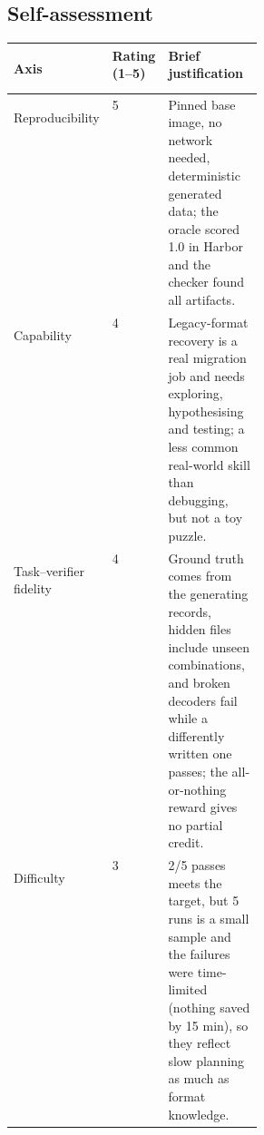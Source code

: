 \documentclass[11pt]{article}
\begin{document}
\subsection*{Self-assessment}
\vspace{-4pt}
\begin{center}
\renewcommand{\arraystretch}{1.15}
\begin{tabularx}{\linewidth}{>{\bfseries\raggedright\arraybackslash}p{0.19\linewidth}p{0.125\linewidth}X}
  \toprule
  Axis & Rating (1--5) & Brief justification \\
  \midrule
  Reproducibility & 5 & Pinned base image, no network needed, deterministic generated data; the oracle scored 1.0 in Harbor and the checker found all artifacts. \\
  Capability & 4 & Legacy-format recovery is a real migration job and needs exploring, hypothesising and testing; a less common real-world skill than debugging, but not a toy puzzle. \\
  Task--verifier fidelity & 4 & Ground truth comes from the generating records, hidden files include unseen combinations, and broken decoders fail while a differently written one passes; the all-or-nothing reward gives no partial credit. \\
  Difficulty & 3 & 2/5 passes meets the target, but 5 runs is a small sample and the failures were time-limited (nothing saved by 15 min), so they reflect slow planning as much as format knowledge. \\
  \bottomrule
\end{tabularx}
\end{center}
\end{document}
